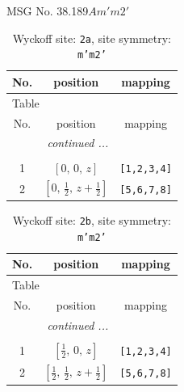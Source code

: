 \documentclass[fleqn,8pt]{jsarticle}
\begin{document}
\setcounter{MaxMatrixCols}{32}

\renewcommand{\tablename}{Table~}
\renewcommand{\figurename}{Figure~}
\begin{center}
\LARGE
MSG No. 38.189\quad$Am'm2'$
\end{center}
\renewcommand{\arraystretch}{1.2}
\begin{longtable}{ccc}
\caption{Wyckoff site: {\tt 2a}, site symmetry: {\tt m'm2'}}
 \\
 \hline \hline
No. & position & mapping \\ \hline \endfirsthead

\multicolumn{2}{l}{\tablename\ \thetable{}} \\
 \hline \hline
No. & position & mapping \\ \hline \endhead

 \hline \hline
\multicolumn{2}{r}{\footnotesize\it continued ...} \\ \endfoot

 \hline \hline
\multicolumn{2}{r}{} \\ \endlastfoot

1 & $\left[ 0,\, 0,\, z \right]$ & {\tt [1,2,3,4]} \\ \hline
2 & $\left[ 0,\, \frac{1}{2},\, z + \frac{1}{2} \right]$ & {\tt [5,6,7,8]} \\
\end{longtable}
\renewcommand{\arraystretch}{1.2}
\begin{longtable}{ccc}
\caption{Wyckoff site: {\tt 2b}, site symmetry: {\tt m'm2'}}
 \\
 \hline \hline
No. & position & mapping \\ \hline \endfirsthead

\multicolumn{2}{l}{\tablename\ \thetable{}} \\
 \hline \hline
No. & position & mapping \\ \hline \endhead

 \hline \hline
\multicolumn{2}{r}{\footnotesize\it continued ...} \\ \endfoot

 \hline \hline
\multicolumn{2}{r}{} \\ \endlastfoot

1 & $\left[ \frac{1}{2},\, 0,\, z \right]$ & {\tt [1,2,3,4]} \\ \hline
2 & $\left[ \frac{1}{2},\, \frac{1}{2},\, z + \frac{1}{2} \right]$ & {\tt [5,6,7,8]} \\
\end{longtable}
\end{document}
